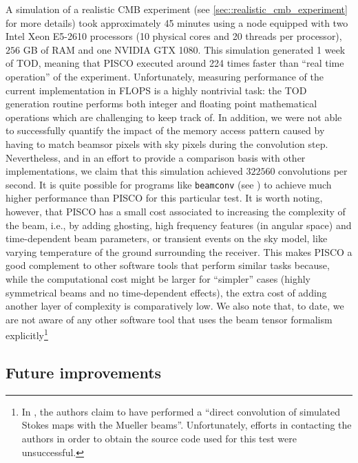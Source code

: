 \documentclass[a4paper,11pt]{article}
\begin{document}
A simulation of a realistic CMB experiment (see \ref{sec::realistic_cmb_experiment} for more details) took approximately 45 minutes using a node equipped with two Intel Xeon E5-2610 processors (10 physical cores and 20 threads per processor), $256$ GB of RAM and one NVIDIA GTX 1080. This simulation generated 1 week of TOD, meaning that PISCO executed around 224 times faster than ``real time operation'' of the experiment. Unfortunately, measuring performance of the current implementation in FLOPS is a highly nontrivial task: the TOD generation routine performs both integer and floating point mathematical operations which are challenging to keep track of. In addition, we were not able to successfully quantify the impact of the memory access pattern caused by having to match beamsor pixels with sky pixels during the convolution step. Nevertheless, and in an effort to provide a comparison basis with other implementations, we claim that this simulation achieved $322560$ convolutions per second. It is quite possible for programs like \texttt{beamconv} (see \cite{2018arXiv180905034D}) to achieve much higher performance than PISCO for this particular test. It is worth noting, however, that PISCO has a small cost associated to increasing the complexity of the beam, i.e., by adding ghosting, high frequency features (in angular space) and time-dependent beam parameters, or transient events on the sky model, like varying temperature of the ground surrounding the receiver. This makes PISCO a good complement to other software tools that perform similar tasks because, while the computational cost might be larger for ``simpler'' cases (highly symmetrical beams and no time-dependent effects), the extra cost of adding another layer of complexity is comparatively low. We also note that, to date, we are not aware of any other software tool that uses the beam tensor formalism explicitly\footnote{In \cite{2007MNRAS.376.1767O}, the authors claim to have performed a ``direct convolution of simulated Stokes maps with the Mueller beams''. Unfortunately, efforts in contacting the authors in order to obtain the source code used for this test were unsuccessful.}

\subsection{Future improvements}
\end{document}
